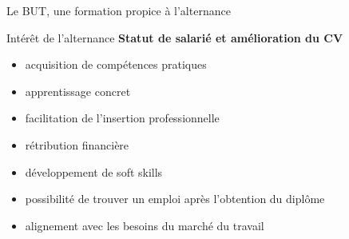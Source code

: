 \documentclass [xcolor=x11names,t] {beamer}
\begin{document}
\begin{frame}{Le BUT, une formation propice à l'alternance} 

\begin{block}{Intérêt de l'alternance}
\textbf{Statut de salarié et amélioration du CV}
\begin{itemize}
    \item acquisition de compétences pratiques %
    \item  apprentissage concret %
    \item facilitation de l'insertion professionnelle %
    \item rétribution financière %
    \item développement de soft skills %
    \item  possibilité de trouver un emploi après l'obtention du diplôme %
    \item alignement avec les besoins du marché du travail %
\end{itemize}


\end{block}
\end{frame}
\end{document}
